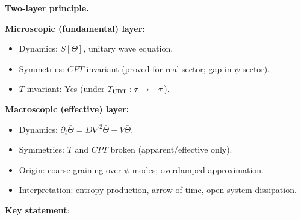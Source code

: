 \documentclass[12pt,a4paper]{article}
\theoremstyle{definition}
\theoremstyle{remark}
\begin{document}
\begin{resultbox}
\textbf{Two-layer principle.}

\medskip
\textbf{Microscopic (fundamental) layer:}
\begin{itemize}
  \item Dynamics: $S[\Theta]$, unitary wave equation.
  \item Symmetries: $CPT$ invariant (proved for real sector; gap in $\psi$-sector).
  \item $T$ invariant: Yes (under $T_{\rm UBT}:\tau\to-\tau$).
\end{itemize}

\medskip
\textbf{Macroscopic (effective) layer:}
\begin{itemize}
  \item Dynamics: $\partial_t\bar\Theta = D\nabla^2\bar\Theta - V\bar\Theta$.
  \item Symmetries: $T$ and $CPT$ broken (apparent/effective only).
  \item Origin: coarse-graining over $\psi$-modes; overdamped approximation.
  \item Interpretation: entropy production, arrow of time, open-system dissipation.
\end{itemize}

\medskip
\textbf{Key statement}:
\begin{center}
\end{center}
\end{resultbox}

\ifdefined\INCLUDEMODE
\else
  
\end{document}
